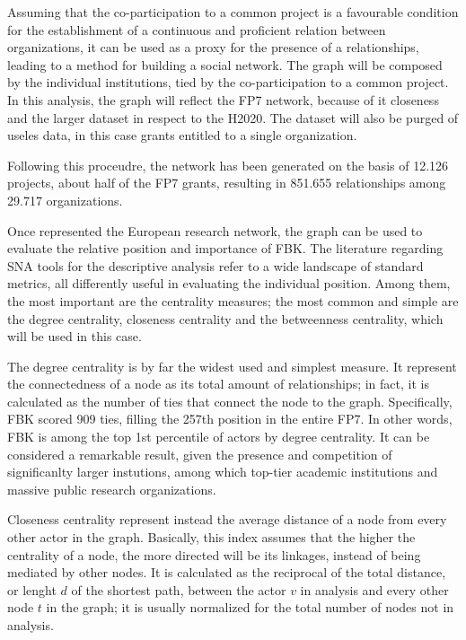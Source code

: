 Assuming that the co-participation to a common project is a favourable condition for the establishment of a continuous and proficient relation between organizations, it can be used as a proxy for the presence of a relationships, leading to a method for building a social network. The graph will be composed by the individual institutions, tied by the co-participation to a common project. In this analysis, the graph will reflect the FP7 network, because of it closeness and the larger dataset in respect to the H2020. The dataset will also be purged of useles data, in this case grants entitled to a single organization. 

Following this proceudre, the network has been generated on the basis of 12.126 projects, about half of the FP7 grants, resulting in 851.655 relationships among 29.717 organizations. 

Once represented the European research network, the graph can be used to evaluate the relative position and importance of FBK. The literature regarding SNA tools for the descriptive analysis refer to a wide landscape of standard metrics, all differently useful in evaluating the individual position. Among them, the most important are the centrality measures; the most common and simple are the degree centrality, closeness centrality and the betweenness centrality, which will be used in this case.

The degree centrality is by far the widest used and simplest measure. It represent the connectedness of a node as its total amount of relationships; in fact, it is calculated as the number of ties that connect the node to the graph. Specifically, FBK scored 909 ties, filling the 257th position in the entire FP7. In other words, FBK is among the top 1st percentile of actors by degree centrality. It can be considered a remarkable result, given the presence and competition of significanlty larger instutions, among which top-tier academic institutions and massive public research organizations. 

Closeness centrality represent instead the average distance of a node from every other actor in the graph. Basically, this index assumes that the higher the centrality of a node, the more directed will be its linkages, instead of being mediated by other nodes. It is calculated as the reciprocal of the total distance, or lenght $d$ of the shortest path, between the actor $v$ in analysis and every other node $t$ in the graph; it is usually normalized for the total number of nodes not in analysis. 

